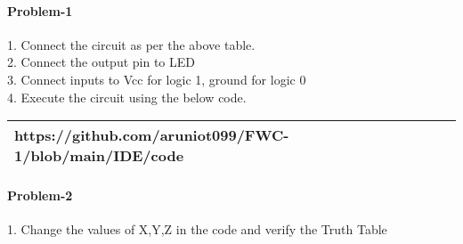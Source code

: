 \documentclass[journal,12pt,twocolumn]{IEEEtran}
\begin{document}
    \paragraph{Problem-1}
    
    1. Connect the circuit as per the above table.\\
    2. Connect the output pin to LED\\
    3. Connect inputs to Vcc for logic 1, ground for logic 0\\
    4. Execute the circuit using the below code.\\
   
\begin{tabularx}{0.46\textwidth} { 
  | >{\centering\arraybackslash}X |}
  \hline
  https://github.com/aruniot099/FWC-1/blob/main/IDE/code\\
  \hline
\end{tabularx}

   \paragraph{Problem-2}
1. Change the values of X,Y,Z in the code and verify the Truth Table\\



\end{document}
